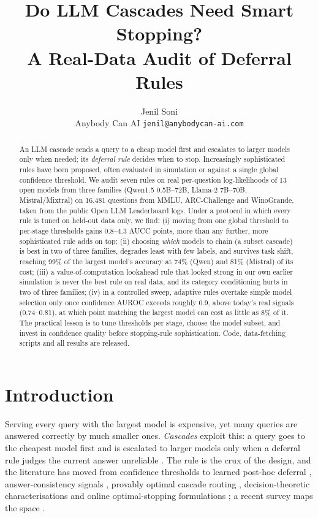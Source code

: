 \documentclass[10pt,twocolumn]{article}
\title{\textbf{Do LLM Cascades Need Smart Stopping?\\A Real-Data Audit of Deferral Rules}}
\author{Jenil Soni\\[2pt]
\small Anybody Can AI \quad\textbar\quad \texttt{jenil@anybodycan-ai.com}}
\date{}
\begin{document}
\maketitle

\begin{abstract}
An LLM cascade sends a query to a cheap model first and escalates to larger models only when needed;
its \emph{deferral rule} decides when to stop. Increasingly sophisticated rules have been proposed,
often evaluated in simulation or against a single global confidence threshold. We audit seven rules
on real per-question log-likelihoods of 13 open models from three families (Qwen1.5 0.5B--72B,
Llama-2 7B--70B, Mistral/Mixtral) on 16{,}481 questions from MMLU, ARC-Challenge and WinoGrande,
taken from the public Open LLM Leaderboard logs. Under a protocol in which every rule is tuned on
held-out data only, we find: (i) moving from one global threshold to per-stage thresholds gains
0.8--4.3 AUCC points, more than any further, more sophisticated rule adds on top; (ii) choosing
\emph{which} models to chain (a subset cascade) is best in two of three families, degrades least with
few labels, and survives task shift, reaching 99\% of the largest model's accuracy at 74\% (Qwen) and
81\% (Mistral) of its cost; (iii) a value-of-computation lookahead rule that looked strong in our own
earlier simulation is never the best rule on real data, and its category conditioning hurts in two
of three families; (iv) in a controlled sweep, adaptive rules overtake simple model selection only
once confidence AUROC exceeds roughly 0.9, above today's real signals (0.74--0.81), at which point
matching the largest model can cost as little as 8\% of it. The practical lesson is to tune thresholds
per stage, choose the model subset, and invest in confidence quality before stopping-rule
sophistication. Code, data-fetching scripts and all results are released.
\end{abstract}

\section{Introduction}
Serving every query with the largest model is expensive, yet many queries are answered correctly by
much smaller ones. \emph{Cascades} exploit this: a query goes to the cheapest model first and is
escalated to larger models only when a deferral rule judges the current answer unreliable
\cite{frugalgpt,jitkrittum2023}. The rule is the crux of the design, and the literature has moved
from confidence thresholds \cite{frugalgpt} to learned post-hoc deferral \cite{jitkrittum2023,gupta2024},
answer-consistency signals \cite{yue2024}, provably optimal cascade routing \cite{dekoninck2025},
decision-theoretic characterisations \cite{bouchard2026} and online optimal-stopping formulations
\cite{belloni2026}; a recent survey maps the space \cite{moslem2026survey}.
\end{document}
